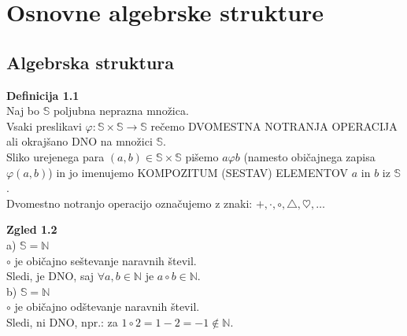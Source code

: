 \documentclass[12pt]{article}
\begin{document}
\section*{Osnovne algebrske strukture}

\subsection*{Algebrska struktura}

\textbf{Definicija 1.1} \\

\noindent
Naj bo $\mathbb{S}$ poljubna neprazna množica. \\
Vsaki preslikavi $\varphi : \mathbb{S} \times \mathbb{S} \to \mathbb{S}$ rečemo DVOMESTNA NOTRANJA OPERACIJA ali okrajšano DNO na množici $\mathbb{S}$. \\
Sliko urejenega para $(a, b) \in \mathbb{S} \times \mathbb{S}$ pišemo $a\varphi b$ (namesto običajnega zapisa $\varphi(a, b)$) in jo imenujemo KOMPOZITUM (SESTAV) ELEMENTOV $a$ in $b$ iz $\mathbb{S}$. \\
Dvomestno notranjo operacijo označujemo z znaki: $+, \cdot, \circ, \triangle, \heartsuit, \ldots$



\vspace{24pt}



\noindent
\textbf{Zgled 1.2} \\

\noindent
a) $\mathbb{S} = \mathbb{N}$ \\ 
\hspace*{1em} $\circ$ je običajno seštevanje naravnih števil. \\
\hspace*{1em} Sledi, je DNO, saj $\forall a, b \in \mathbb{N}$ je $a \circ b \in \mathbb{N}$. \\

\noindent
b) $\mathbb{S} = \mathbb{N}$ \\
\hspace*{1em} $\circ$ je običajno odštevanje naravnih števil. \\
\hspace*{1em} Sledi, ni DNO, npr.: za $1 \circ 2 = 1 - 2 = -1 \notin \mathbb{N}$.



\end{document}
